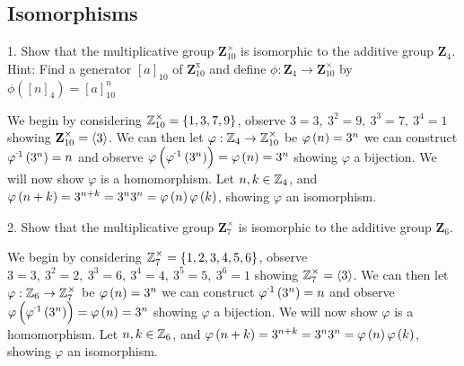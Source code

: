 \subsection{Isomorphisms}
\begin{mdframed}[style=darkQuesion]
1. Show that the multiplicative group $\mathbf{Z}_{10}^{\times}$ is isomorphic to the additive group $\mathbf{Z}_{4}$. Hint: Find a generator $[a]_{10}$ of $\mathbf{Z}_{10}^{\mathrm{x}}$ and define $\phi: \mathbf{Z}_{4} \rightarrow \mathbf{Z}_{10}^{\times}$ by $\phi\left([n]_{4}\right)=[a]_{10}^{n}$
\end{mdframed}
\begin{mdframed}[style=darkAnswer,frametitle={Joe Starr}]
We begin by considering $\mathbf{\mathbb{Z}}_{10}^{\times}=\left\{1, 3, 7, 9\right\}$, observe
$3=3,\ 3^2=9,\ 3^3=7,\ 3^4=1$ showing $\mathbf{Z}_{10}^{\times}=\left<3\right>$. We
can then let $\varphi:\mathbb{Z}_4\to \mathbb{Z}_{10}^\times$ be $\varphi\left(n\right)=3^n$ we can construct
$\pofinv{3^n}=n$ and observe $\pof{\pofinv{3^n}}=\pof{n}=3^n$ showing
$\varphi$ a bijection. We will now show $\varphi$ is a homomorphism.
Let $n,k\in \mathbb{Z}_4$, and $\varphi\left(n+k\right)=3^{n+k}=3^{n}3^{n}=\varphi\left(n\right)\varphi\left(k\right)$, showing
$\varphi$ an isomorphism.
\end{mdframed}
\newpage
\begin{mdframed}[style=darkQuesion]
2. Show that the multiplicative group $\mathbf{Z}_{7}^{\times}$ is isomorphic to the additive group $\mathbf{Z}_{6}$.
\end{mdframed}
\begin{mdframed}[style=darkAnswer,frametitle={Joe Starr}]
We begin by considering $\mathbf{\mathbb{Z}}_{7}^{\times}=\left\{1,2, 3,4,5,6\right\}$, observe
$3=3,\ 3^2=2,\ 3^3=6,\ 3^4=4,\ 3^5=5,\ 3^6=1$ showing $\mathbf{\mathbb{Z}}_{7}^{\times}=\left<3\right>$. We
can then let $\varphi:\mathbb{Z}_6\to \mathbb{Z}_{7}^\times$ be $\varphi\left(n\right)=3^n$ we can construct
$\pofinv{3^n}=n$ and observe $\pof{\pofinv{3^n}}=\pof{n}=3^n$ showing
$\varphi$ a bijection. We will now show $\varphi$ is a homomorphism.
Let $n,k\in \mathbb{Z}_6$, and $\varphi\left(n+k\right)=3^{n+k}=3^{n}3^{n}=\varphi\left(n\right)\varphi\left(k\right)$, showing
$\varphi$ an isomorphism.
\end{mdframed}
